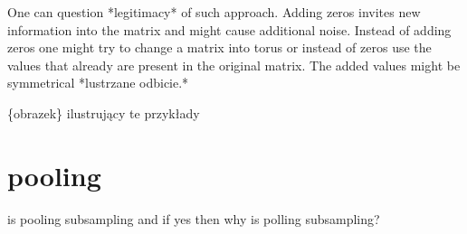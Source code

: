 \documentclass[a4paper,10pt]{report}
\begin{document}
      One can question *legitimacy* of such approach. Adding zeros invites new information into the matrix and might cause additional noise. Instead of adding zeros one might try to change a matrix into torus or instead of zeros use the values that already are present in the original matrix. The added values might be symmetrical *lustrzane odbicie.*
	  
      \{obrazek\} ilustrujący te przykłady 
      
    \section{pooling}	  
      is pooling subsampling and if yes then why is polling subsampling? 

    
\end{document}
